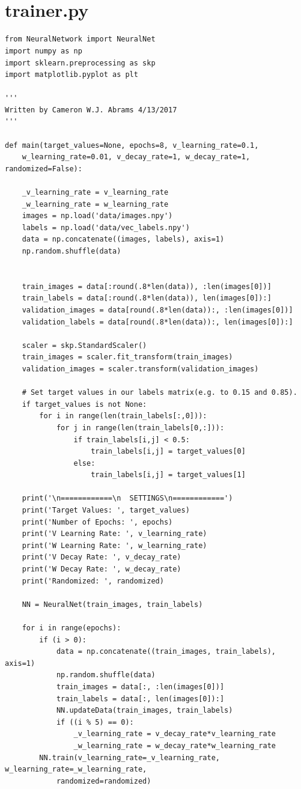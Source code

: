 \documentclass[12pt]{article}
\begin{document}
\section{\\trainer.py}
\begin{verbatim}
from NeuralNetwork import NeuralNet
import numpy as np
import sklearn.preprocessing as skp
import matplotlib.pyplot as plt

'''
Written by Cameron W.J. Abrams 4/13/2017
'''

def main(target_values=None, epochs=8, v_learning_rate=0.1,
	w_learning_rate=0.01, v_decay_rate=1, w_decay_rate=1, randomized=False):

	_v_learning_rate = v_learning_rate
	_w_learning_rate = w_learning_rate
	images = np.load('data/images.npy')
	labels = np.load('data/vec_labels.npy')
	data = np.concatenate((images, labels), axis=1)
	np.random.shuffle(data)
	

	train_images = data[:round(.8*len(data)), :len(images[0])]
	train_labels = data[:round(.8*len(data)), len(images[0]):]
	validation_images = data[round(.8*len(data)):, :len(images[0])]
	validation_labels = data[round(.8*len(data)):, len(images[0]):]

	scaler = skp.StandardScaler()
	train_images = scaler.fit_transform(train_images)
	validation_images = scaler.transform(validation_images)

	# Set target values in our labels matrix(e.g. to 0.15 and 0.85).
	if target_values is not None:
		for i in range(len(train_labels[:,0])):
			for j in range(len(train_labels[0,:])):
				if train_labels[i,j] < 0.5:
					train_labels[i,j] = target_values[0]
				else:
					train_labels[i,j] = target_values[1]

	print('\n============\n  SETTINGS\n============')
	print('Target Values: ', target_values)
	print('Number of Epochs: ', epochs)
	print('V Learning Rate: ', v_learning_rate)
	print('W Learning Rate: ', w_learning_rate)
	print('V Decay Rate: ', v_decay_rate)
	print('W Decay Rate: ', w_decay_rate)
	print('Randomized: ', randomized)

	NN = NeuralNet(train_images, train_labels)

	for i in range(epochs):
		if (i > 0):
			data = np.concatenate((train_images, train_labels), axis=1)
			np.random.shuffle(data)
			train_images = data[:, :len(images[0])]
			train_labels = data[:, len(images[0]):]
			NN.updateData(train_images, train_labels)
			if ((i % 5) == 0):
				_v_learning_rate = v_decay_rate*v_learning_rate
				_w_learning_rate = w_decay_rate*w_learning_rate
		NN.train(v_learning_rate=_v_learning_rate, w_learning_rate=_w_learning_rate,
			randomized=randomized)


\end{verbatim}
\end{document}
